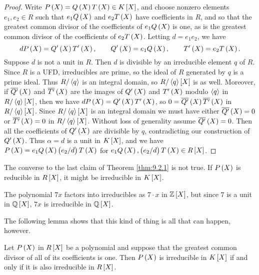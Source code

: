 \begin{proof}
Write $ P\br{X} = Q\br{X}T\br{X} \in K\sbr{X} $, and choose nonzero elements $ e_1, e_2 \in R $ such that $ e_1Q\br{X} $ and $ e_2T\br{X} $ have coefficients in $ R $, and so that the greatest common divisor of the coefficients of $ e_1Q\br{X} $ is one, as is the greatest common divisor of the coefficients of $ e_2T\br{X} $. Letting $ d = e_1e_2 $, we have
$$ dP\br{X} = Q'\br{X}T'\br{X}, \qquad Q'\br{X} = e_1Q\br{X}, \qquad T'\br{X} = e_2T\br{X}. $$
Suppose $ d $ is not a unit in $ R $. Then $ d $ is divisible by an irreducible element $ q $ of $ R $. Since $ R $ is a UFD, irreducibles are prime, so the ideal of $ R $ generated by $ q $ is a prime ideal. Thus $ R / \left\langle q \right\rangle $ is an integral domain, so $ R / \abr{q}\sbr{X} $ is as well. Moreover, if $ \overline{Q'}\br{X} $ and $ \overline{T'}\br{X} $ are the images of $ Q'\br{X} $ and $ T'\br{X} $ modulo $ \left\langle q \right\rangle $ in $ R / \abr{q}\sbr{X} $, then we have $ dP\br{X} = Q'\br{X}T'\br{X} $, so $ 0 = \overline{Q'}\br{X}\overline{T'}\br{X} $ in $ R / \abr{q}\sbr{X} $. Since $ R / \abr{q}\sbr{X} $ is an integral domain we must have either $ \overline{Q'}\br{X} = 0 $ or $ \overline{T'}\br{X} = 0 $ in $ R / \abr{q}\sbr{X} $. Without loss of generality assume $ \overline{Q'}\br{X} = 0 $. Then all the coefficients of $ Q'\br{X} $ are divisible by $ q $, contradicting our construction of $ Q'\br{X} $. Thus $ \alpha = d $ is a unit in $ K\sbr{X} $, and we have $ P\br{X} = e_1Q\br{X}\br{e_2 / d}T\br{X} $ for $ e_1Q\br{X}, \br{e_2 / d}T\br{X} \in R\sbr{X} $.
\end{proof}

\pagebreak

\begin{note*}
The converse to the last claim of Theorem \ref{thm:9.2.1} is not true. If $ P\br{X} $ is reducible in $ R\sbr{X} $, it might be irreducible in $ K\sbr{X} $.
\end{note*}

\begin{example*}
The polynomial $ 7x $ factors into irreducibles as $ 7 \cdot x $ in $ \ZZ\sbr{X} $, but since $ 7 $ is a unit in $ \QQ\sbr{X} $, $ 7x $ is irreducible in $ \QQ\sbr{X} $.
\end{example*}

The following lemma shows that this kind of thing is all that can happen, however.

\begin{proposition}
Let $ P\br{X} $ in $ R\sbr{X} $ be a polynomial and suppose that the greatest common divisor of all of its coefficients is one. Then $ P\br{X} $ is irreducible in $ K\sbr{X} $ if and only if it is also irreducible in $ R\sbr{X} $.
\end{proposition}

